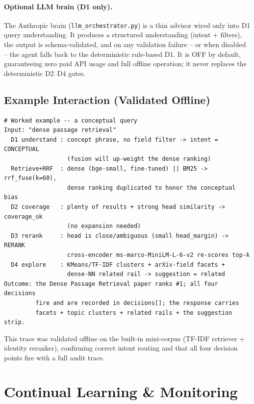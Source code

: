 \documentclass[12pt,a4paper]{article}
\begin{document}
\paragraph{Optional LLM brain (D1 only).} The Anthropic brain (\texttt{llm\_orchestrator.py}) is a thin advisor wired only into D1 query understanding. It produces a structured understanding (intent + filters), the output is schema-validated, and on any validation failure -- or when disabled -- the agent falls back to the deterministic rule-based D1. It is OFF by default, guaranteeing zero paid API usage and full offline operation; it never replaces the deterministic D2--D4 gates.

\subsection{Example Interaction (Validated Offline)}

\begin{lstlisting}
# Worked example -- a conceptual query
Input: "dense passage retrieval"
  D1 understand : concept phrase, no field filter -> intent = CONCEPTUAL
                  (fusion will up-weight the dense ranking)
  Retrieve+RRF  : dense (bge-small, fine-tuned) || BM25 -> rrf_fuse(k=60),
                  dense ranking duplicated to honor the conceptual bias
  D2 coverage   : plenty of results + strong head similarity -> coverage_ok
                  (no expansion needed)
  D3 rerank     : head is close/ambiguous (small head_margin) -> RERANK
                  cross-encoder ms-marco-MiniLM-L-6-v2 re-scores top-k
  D4 explore    : KMeans/TF-IDF clusters + arXiv-field facets +
                  dense-NN related rail -> suggestion = related
Outcome: the Dense Passage Retrieval paper ranks #1; all four decisions
         fire and are recorded in decisions[]; the response carries
         facets + topic clusters + related rails + the suggestion strip.
\end{lstlisting}

This trace was validated offline on the built-in mini-corpus (TF-IDF retriever + identity reranker), confirming correct intent routing and that all four decision points fire with a full audit trace.

\section{Continual Learning \& Monitoring}
\label{sec:continual}
\end{document}
